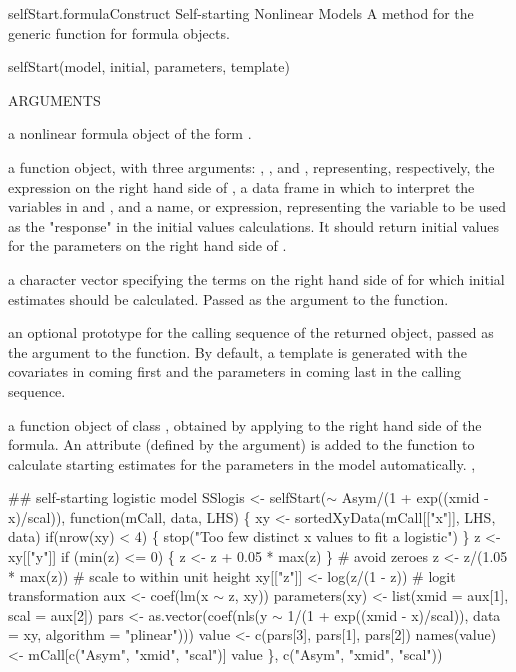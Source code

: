 \documentclass[pdftex]{article} \usepackage{url,graphicx}
\renewcommand{\Twiddle}{\mbox{\(\sim\)}}
\begin{document}
\begin{Helpfile}{selfStart.formula}{Construct Self-starting Nonlinear Models}
A method for the generic function  for formula objects.
\begin{Example}
selfStart(model, initial, parameters, template)
\end{Example}
\begin{Argument}{ARGUMENTS}
\item[\Co{model:}]
a nonlinear formula object of the form \Co{{\Twiddle}expression}.
\item[\Co{initial:}]
a function object, with three arguments: ,
, and , representing, respectively, the
expression on the right hand side of , a data frame in
which to interpret the variables in  and , and
a name, or expression, representing the variable to be used as the
"response" in the initial values calculations. It should return
initial values for the parameters on the right hand side of
.
\item[\Co{parameters:}]
a character vector specifying the terms on the right
hand side of  for which initial estimates should be
calculated. Passed as the  argument to the 
function.
\item[\Co{template:}]
an optional prototype for the calling sequence of the
returned object, passed as the  argument to the
 function. By default, a template is generated with the
covariates in  coming first and the parameters in
 coming last in the calling sequence.
\end{Argument}
a function object of class , obtained by applying
 to the right hand side of the  formula. An
 attribute (defined by the  argument) is
added to the function to calculate starting estimates for the
parameters in the model automatically.
, 
\need 15pt
\vspace{-16pt}
\begin{Example}
## self-starting logistic model
SSlogis <- selfStart({\Twiddle} Asym/(1 + exp((xmid - x)/scal)),
  function(mCall, data, LHS)
  \{
    xy <- sortedXyData(mCall[["x"]], LHS, data)
    if(nrow(xy) < 4) \{
      stop("Too few distinct x values to fit a logistic")
    \}
    z <- xy[["y"]]
    if (min(z) <= 0) \{ z <- z + 0.05 * max(z) \} # avoid zeroes
    z <- z/(1.05 * max(z))        # scale to within unit height
    xy[["z"]] <- log(z/(1 - z))        # logit transformation
    aux <- coef(lm(x {\Twiddle} z, xy))
    parameters(xy) <- list(xmid = aux[1], scal = aux[2])
    pars <- as.vector(coef(nls(y {\Twiddle} 1/(1 + exp((xmid - x)/scal)), 
                   data = xy, algorithm = "plinear")))
    value <- c(pars[3], pars[1], pars[2])
    names(value) <- mCall[c("Asym", "xmid", "scal")]
    value
  \}, c("Asym", "xmid", "scal"))
\end{Example}
\end{Helpfile}
\end{document}
